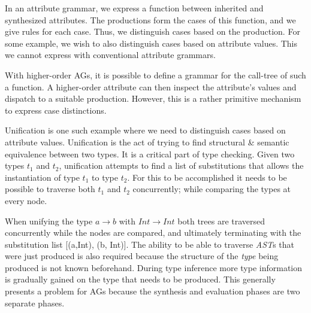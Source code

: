 In an attribute grammar, we express a function between inherited and synthesized attributes. The productions form the cases of this function, and we give rules for each case. Thus, we distinguish cases based on the production. For some example, we wish to also distinguish cases based on attribute values. This we cannot express with conventional attribute grammars.

With higher-order AGs, it is possible to define a grammar for the call-tree of such a function. A higher-order attribute can then inspect the attribute's values and dispatch to a suitable production. However, this is a rather primitive mechanism to express case distinctions.

Unification is one such example where we need to distinguish cases based on attribute values. Unification is the act of trying to find structural \& semantic equivalence between two types. It is a critical part of type checking. Given two types \emph{$t_{1}$} and \emph{$t_{2}$}, unification attempts to find a list of substitutions that allows the instantiation of type \emph{$t_{1}$} to type \emph{$t_{2}$}. For this to be accomplished it needs to be possible to traverse both \emph{$t_{1}$} and \emph{$t_{2}$} concurrently; while comparing the types at every node.

%
%    
%

When unifying the type \emph{$a \rightarrow b$} with \emph{$Int \rightarrow Int$} both trees are traversed concurrently while the nodes are compared, and ultimately terminating with the substitution list [(a,Int), (b, Int)]. The ability to be able to traverse \emph{AST}s that were just produced is also required because the structure of the \emph{type} being produced is not known beforehand. During type inference more type information is gradually gained on the type that needs to be produced. This generally presents a problem for AGs\cite{ruler-front} because the synthesis and evaluation phases are two separate phases.

